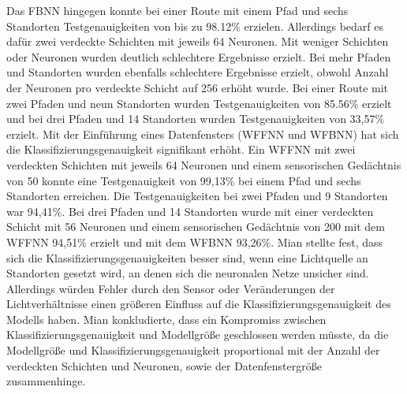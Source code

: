 \newline
Das FBNN hingegen konnte bei einer Route mit einem Pfad und sechs Standorten Testgenauigkeiten von bis zu 98.12\% erzielen.
Allerdings bedarf es dafür zwei verdeckte Schichten mit jeweils 64 Neuronen.
Mit weniger Schichten oder Neuronen wurden deutlich schlechtere Ergebnisse erzielt.
Bei mehr Pfaden und Standorten wurden ebenfalls schlechtere Ergebnisse erzielt, obwohl Anzahl der Neuronen pro verdeckte Schicht auf 256 erhöht wurde.
Bei einer Route mit zwei Pfaden und neun Standorten wurden Testgenauigkeiten von 85.56\% erzielt und
bei drei Pfaden und 14 Standorten wurden Testgenauigkeiten von 33,57\% erzielt.
\newline
\newline
Mit der Einführung eines Datenfensters (WFFNN und WFBNN) hat sich die Klassifizierungsgenauigkeit signifikant erhöht.
Ein WFFNN mit zwei verdeckten Schichten mit jeweils 64 Neuronen und einem sensorischen Gedächtnis von 50 konnte eine Testgenauigkeit von 99,13\%
bei einem Pfad und sechs Standorten erreichen.
Die Testgenauigkeiten bei zwei Pfaden und 9 Standorten war 94,41\%.
Bei drei Pfaden und 14 Standorten wurde mit einer verdeckten Schicht mit 56 Neuronen und einem sensorischen Gedächtnis von 200 mit dem WFFNN 94,51\% erzielt
und mit dem WFBNN 93,26\%.
\newline
\newline
Mian stellte fest, dass sich die Klassifizierungsgenauigkeiten besser sind,
wenn eine Lichtquelle an Standorten gesetzt wird, an denen sich die neuronalen Netze unsicher sind.
Allerdings würden Fehler durch den Sensor oder Veränderungen der Lichtverhältnisse
einen größeren Einfluss auf die Klassifizierungsgenauigkeit des Modells haben.
\newline
\newline
Mian konkludierte, dass ein Kompromiss zwischen Klassifizierungsgenauigkeit und Modellgröße geschlossen werden müsste,
da die Modellgröße und Klassifizierungsgenauigkeit proportional mit der Anzahl der verdeckten Schichten und Neuronen,
sowie der Datenfenstergröße zusammenhinge.
